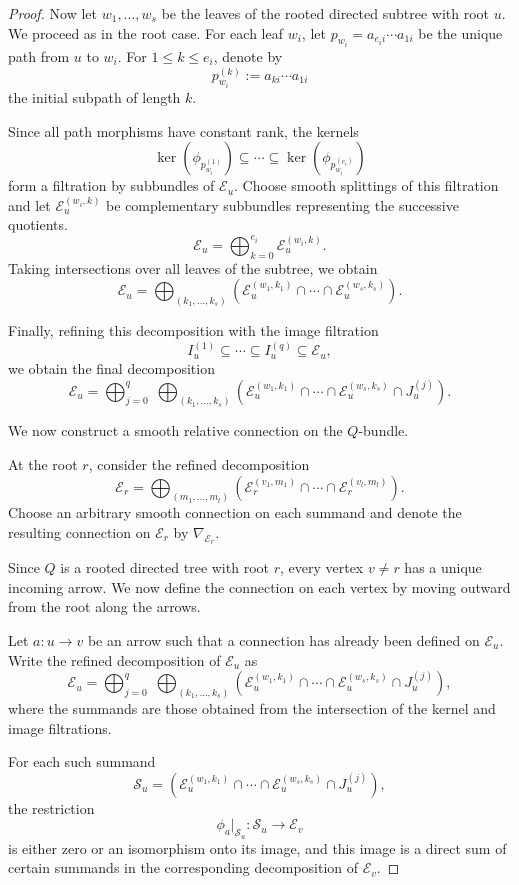 \documentclass[10pt,a4paper]{amsart}
\begin{document}
\begin{proof}
Now let $w_1, \dots, w_s$ be the leaves of the rooted directed subtree with root $u$. We proceed as in the root case. For each leaf $w_i$, let
$p_{w_i} = a_{e_i i} \cdots a_{1 i}$
be the unique path from $u$ to $w_i$. 
For $1 \le k \le e_i$, denote by
\[
p_{w_i}^{(k)} := a_{k i} \cdots a_{1 i}
\]
the initial subpath of length $k$.

Since all path morphisms have constant rank, the kernels
\[
\ker(\phi_{p_{w_i}^{(1)}})
\subseteq
\cdots
\subseteq
\ker(\phi_{p_{w_i}^{(e_i)}})
\]
form a filtration by subbundles of $\mathcal{E}_u$. Choose smooth splittings of this filtration and let 
$\mathcal{E}_u^{(w_i,k)}$ be complementary subbundles representing the successive quotients.
\[
\mathcal{E}_u
=
\bigoplus_{k=0}^{e_i}
\mathcal{E}_u^{(w_i,k)}.
\]
Taking intersections over all leaves of the subtree, we obtain
\[
\mathcal{E}_u
=
\bigoplus_{(k_1,\dots,k_s)}
\left(
\mathcal{E}_u^{(w_1,k_1)}
\cap
\cdots
\cap
\mathcal{E}_u^{(w_s,k_s)}
\right).
\]

Finally, refining this decomposition with the image filtration
\[
I_u^{(1)} \subseteq \cdots \subseteq I_u^{(q)} \subseteq \mathcal{E}_u,
\]
we obtain the final decomposition
\[
\mathcal{E}_u
=
\bigoplus_{j=0}^{q}
\;
\bigoplus_{(k_1,\dots,k_s)}
\left(
\mathcal{E}_u^{(w_1,k_1)}
\cap
\cdots
\cap
\mathcal{E}_u^{(w_s,k_s)}
\cap
J_u^{(j)}
\right).
\]


We now construct a smooth relative connection on the $Q$-bundle.

At the root $r$, consider the refined decomposition
\[
\mathcal{E}_r
=
\bigoplus_{(m_1,\dots,m_l)}
\left(
\mathcal{E}_r^{(v_1,m_1)}
\cap
\cdots
\cap
\mathcal{E}_r^{(v_l,m_l)}
\right).
\]
Choose an arbitrary smooth connection on each summand and denote the
resulting connection on $\mathcal{E}_r$ by $\nabla_{\mathcal{E}_r}$.

Since $Q$ is a rooted directed tree with root $r$, every vertex $v \neq r$ has a unique
incoming arrow. We now define the connection on each vertex by
moving outward from the root along the arrows.

Let $a : u \to v$ be an arrow such that a connection has already
been defined on $\mathcal{E}_u$. Write the refined decomposition of $\mathcal{E}_u$ as
\[
\mathcal{E}_u
=
\bigoplus_{j=0}^{q}
\;
\bigoplus_{(k_1,\dots,k_s)}
\left(
\mathcal{E}_u^{(w_1,k_1)}
\cap
\cdots
\cap
\mathcal{E}_u^{(w_s,k_s)}
\cap
J_u^{(j)}
\right),
\]
where the summands are those obtained from the intersection of
the kernel and image filtrations.

For each such summand
\[
\mathcal{S}_u
=
\left(
\mathcal{E}_u^{(w_1,k_1)}
\cap
\cdots
\cap
\mathcal{E}_u^{(w_s,k_s)}
\cap
J_u^{(j)}
\right),
\]
the restriction
\[
\phi_a\big|_{\mathcal{S}_u}
:
\mathcal{S}_u
\longrightarrow
\mathcal{E}_v
\]
is either zero or an isomorphism onto its image, and this image
is a direct sum of certain summands in the corresponding
decomposition of $\mathcal{E}_v$.


\end{proof}
\end{document}
